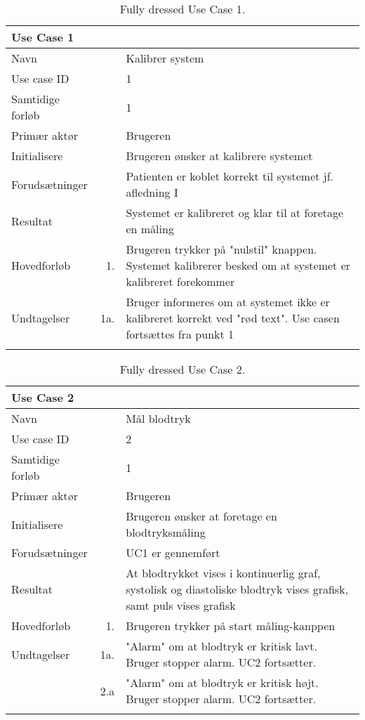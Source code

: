 \begin{longtabu} to  %
    {\large \textbf{Use Case 1}} && \\
    \toprule
    Navn &&    Kalibrer system\\
    Use case ID &&    1\\
    Samtidige forløb &&    1\\
    Primær aktør &&    Brugeren\\
    Initialisere &&    Brugeren ønsker at kalibrere systemet\\
    Forudsætninger &&  Patienten er koblet korrekt til systemet jf. afledning I\\
    Resultat &&    Systemet er kalibreret og klar til at foretage en måling\\
    \midrule
    Hovedforløb &    1. &    Brugeren trykker på "nulstil" knappen. Systemet kalibrerer besked om at systemet er kalibreret forekommer \\ \midrule
    Undtagelser &    1a. & Bruger informeres om at systemet ikke er kalibreret korrekt ved "rød text". Use casen fortsættes fra punkt 1     \\ \bottomrule    
\caption{Fully dressed Use Case 1.}
\label{UC1}
\end{longtabu}

\begin{longtabu} to  %
    {\large \textbf{Use Case 2}} && \\
    \toprule
    Navn &&    Mål blodtryk\\
    Use case ID &&    2\\
    Samtidige forløb &&    1\\
    Primær aktør &&    Brugeren\\
    Initialisere &&    Brugeren ønsker at foretage en blodtryksmåling\\
    Forudsætninger && UC1 er gennemført\\
    Resultat &&    At blodtrykket vises i kontinuerlig graf, systolisk og diastoliske blodtryk vises grafisk, samt puls vises grafisk                     \\ \midrule
    Hovedforløb &    1. &    Brugeren trykker på start måling\--kanppen  \\ \midrule
                
    Undtagelser &    1a. & "Alarm" om at blodtryk er kritisk lavt. Bruger stopper alarm. UC2 fortsætter. \\  & 2.a & "Alarm" om at blodtryk er kritisk højt. Bruger stopper alarm. UC2 fortsætter. \\ \bottomrule
\caption{Fully dressed Use Case 2.}
\label{UC2}
\end{longtabu}

